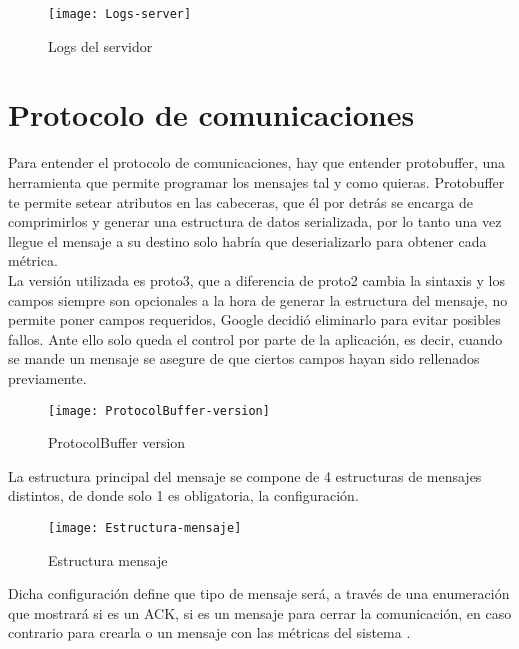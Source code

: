 \documentclass[ spanish, a4paper, 12pt, oneside]{report}
\begin{document}
\begin{figure}[!h]
   \centering
   \texttt{[image: Logs-server]}\\
      \caption{\label{fig: Logs del servidor} Logs del servidor}
\end{figure}

\section{Protocolo de comunicaciones}

Para entender el protocolo de comunicaciones, hay que entender protobuffer, una herramienta que permite programar los mensajes tal y como quieras. Protobuffer te permite setear atributos en las cabeceras, que él por detrás se encarga de 
comprimirlos y generar una estructura de datos serializada, por lo tanto una vez llegue el mensaje a su destino solo habría que deserializarlo para obtener cada métrica. \\

La versión utilizada es proto3, que a diferencia de proto2 cambia la sintaxis y los campos siempre son opcionales a la hora de generar la estructura del mensaje, no permite poner campos requeridos, Google decidió eliminarlo para 
evitar posibles fallos. Ante ello solo queda el control por parte de la aplicación, es decir, cuando se mande un mensaje se asegure de que ciertos campos hayan sido rellenados previamente. \\


\begin{figure}[!h]
   \centering
   \texttt{[image: ProtocolBuffer-version]}\\
      \caption{\label{fig: ProtocolBuffer version} ProtocolBuffer version}
\end{figure}

La estructura principal del mensaje se compone de 4 estructuras de mensajes distintos, de donde solo 1 es obligatoria, la configuración. \\

\begin{figure}[!h]
   \centering
   \texttt{[image: Estructura-mensaje]}\\
      \caption{\label{fig: Estructura mensaje} Estructura mensaje}
\end{figure}

Dicha configuración define que tipo de mensaje será, a través de una enumeración que mostrará si es un ACK, si es un mensaje para cerrar la comunicación, en caso contrario para crearla o un mensaje con las métricas del sistema . \\
\end{document}
